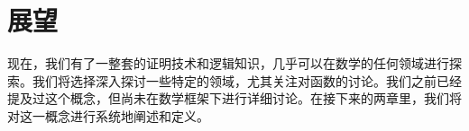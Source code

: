 \section{展望}

现在，我们有了一整套的证明技术和逻辑知识，几乎可以在数学的任何领域进行探索。我们将选择深入探讨一些特定的领域，尤其关注对函数的讨论。我们之前已经提及过这个概念，但尚未在数学框架下进行详细讨论。在接下来的两章里，我们将对这一概念进行系统地阐述和定义。